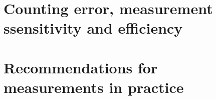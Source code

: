 \section{Counting error, measurement ssensitivity and efficiency}
\section{Recommendations for measurements in practice}